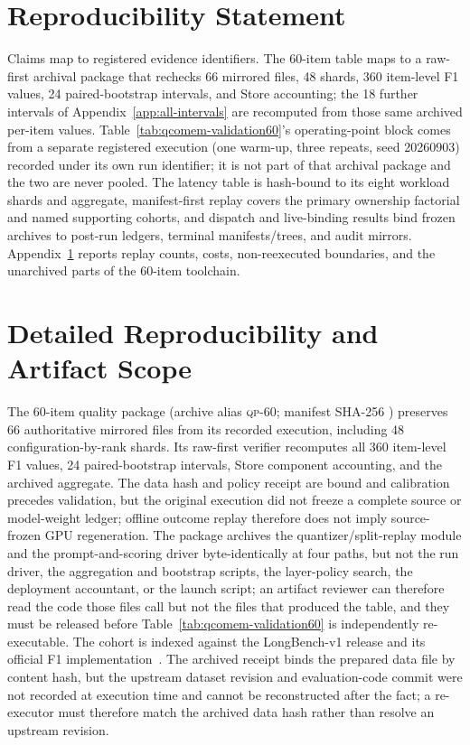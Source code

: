 \documentclass{article}
\begin{document}
\section*{Reproducibility Statement}
Claims map to registered evidence identifiers. The 60-item table maps to a
raw-first archival package that rechecks 66 mirrored files, 48 shards, 360
item-level F1 values, 24 paired-bootstrap intervals, and Store accounting; the
18 further intervals of Appendix~\ref{app:all-intervals} are recomputed from
those same archived per-item values. Table~\ref{tab:qcomem-validation60}'s
operating-point block comes from a separate registered execution (one warm-up,
three repeats, seed 20260903) recorded under its own run identifier; it is not
part of that archival package and the two are never pooled. The latency table is
hash-bound to its eight workload shards and aggregate, manifest-first replay
covers the primary
ownership factorial and named supporting cohorts, and dispatch and live-binding
results bind frozen archives to post-run ledgers, terminal manifests/trees, and
audit mirrors. Appendix~\ref{app:reproducibility} reports replay counts, costs,
non-reexecuted boundaries, and the unarchived parts of the 60-item toolchain.




\appendix

\section{Detailed Reproducibility and Artifact Scope}
\label{app:reproducibility}

The 60-item quality package (archive alias \textsc{qp-60}; manifest SHA-256
)
preserves 66 authoritative mirrored files from its recorded execution,
including 48 configuration-by-rank shards.  Its
raw-first verifier recomputes all 360 item-level F1 values, 24 paired-bootstrap
intervals, Store component accounting, and the archived aggregate.  The data
hash and policy receipt are bound and calibration precedes validation, but the
original execution did not freeze a complete source or model-weight ledger;
offline outcome replay therefore does not imply source-frozen GPU
regeneration.  The package archives the quantizer/split-replay module and the
prompt-and-scoring driver byte-identically at four paths, but not the run
driver, the aggregation and bootstrap scripts, the layer-policy search, the
deployment accountant, or the launch script; an artifact reviewer can therefore
read the code those files call but not the files that produced the table, and
they must be released before Table~\ref{tab:qcomem-validation60} is
independently re-executable.  The cohort is indexed against the LongBench-v1
release and its official F1
implementation~\citep{bai2024longbenchrelease,bai2024longbenchcode}.  The
archived receipt binds the prepared data file by content hash, but the upstream
dataset revision and evaluation-code commit were not recorded at execution time
and cannot be reconstructed after the fact; a re-executor must therefore match
the archived data hash rather than resolve an upstream revision.
\end{document}
